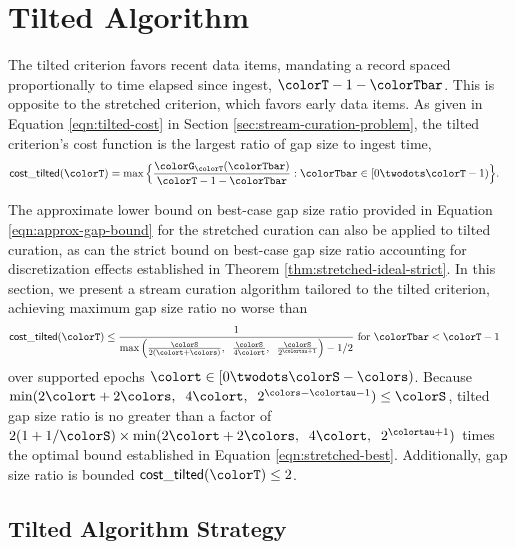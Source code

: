 \section{Tilted Algorithm} \label{sec:tilted}

The tilted criterion favors recent data items, mandating a record spaced proportionally to time elapsed since ingest, $\colorT - 1 - \colorTbar$.
This is opposite to the stretched criterion, which favors early data items.
As given in Equation \ref{eqn:tilted-cost} in Section \ref{sec:stream-curation-problem}, the tilted criterion's cost function is the largest ratio of gap size to ingest time,
\begin{align*}
\mathsf{cost\_tilted}(\colorT)
&=
\max\Big\{\frac{\colorG_{\colorT}(\colorTbar)}{\colorT - 1 - \colorTbar} : \colorTbar \in [0 \twodots \colorT-1)\Big\}.
\end{align*}

The approximate lower bound on best-case gap size ratio provided in Equation \ref{eqn:approx-gap-bound} for the stretched curation can also be applied to tilted curation, as can the strict bound on best-case gap size ratio accounting for discretization effects established in Theorem \ref{thm:stretched-ideal-strict}.
In this section, we present a stream curation algorithm tailored to the tilted criterion, achieving maximum gap size ratio no worse than
\begin{align}
  \mathsf{cost\_tilted}(\colorT)
  &\leq
  \frac{
    1
  }{
    \max\Big(
      \frac{\colorS}{2(\colort + \colors)},\;\;
      \frac{\colorS}{4\colort},\;\;
      \frac{\colorS}{2^{\colortau + 1}}
    \Big)
    - 1/2
  }
  \text{ for }
  \colorTbar < \colorT - 1
  \label{eqn:tilted-gap-size-bound}
\end{align}
over supported epochs $\colort \in [0\twodots\colorS - \colors)$.
Because $\min(2\colort + 2\colors,\;\; 4\colort,\;\; 2^{\colors - \colortau - 1}) \leq \colorS$, tilted gap size ratio is no greater than a factor of $2(1 + 1/\colorS)\times\min(2\colort + 2\colors, \;\; 4\colort, \;\; 2^{\colortau + 1})$ times the optimal bound established in Equation \ref{eqn:stretched-best}.
Additionally, gap size ratio is bounded $\mathsf{cost\_tilted}(\colorT) \leq 2$.


\subsection{Tilted Algorithm Strategy}
\label{sec:tilted-strategy}

